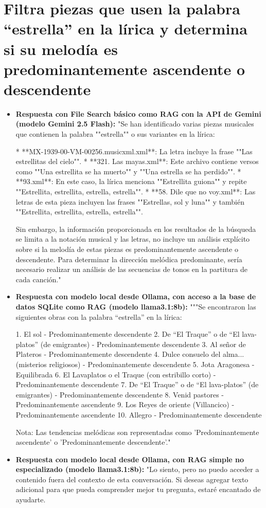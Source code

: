 \section{Filtra piezas que usen la palabra ``estrella'' en la lírica y determina si su melodía es predominantemente ascendente o descendente}
\begin{itemize}
    \item \textbf{Respuesta con File Search básico como RAG con la API de Gemini (modelo Gemini 2.5 Flash):} "Se han identificado varias piezas musicales que contienen la palabra ""estrella"" o sus variantes en la lírica:

*   **MX-1939-00-VM-00256.musicxml.xml**: La letra incluye la frase ""Las estrellitas del cielo"".
*   **321. Las mayas.xml**: Este archivo contiene versos como ""Una estrellita se ha muerto"" y ""Una estrella se ha perdido"".
*   **93.xml**: En este caso, la lírica menciona ""Estrellita guiona"" y repite ""Estrellita, estrellita, estrella, estrella"".
*   **58. Dile que no voy.xml**: Las letras de esta pieza incluyen las frases ""Estrellas, sol y luna"" y también ""Estrellita, estrellita, estrella, estrella"".

Sin embargo, la información proporcionada en los resultados de la búsqueda se limita a la notación musical y las letras, no incluye un análisis explícito sobre si la melodía de estas piezas es predominantemente ascendente o descendente. Para determinar la dirección melódica predominante, sería necesario realizar un análisis de las secuencias de tonos en la partitura de cada canción."
    \item \textbf{Respuesta con modelo local desde Ollama, con acceso a la base de datos SQLite como RAG (modelo llama3.1:8b):} """Se encontraron las siguientes obras con la palabra ``estrella'' en la lírica:

1. El sol - Predominantemente descendente
2. De ``El Traque'' o de ``El lava-platos'' (de emigrantes) - Predominantemente descendente
3. Al señor de Plateros - Predominantemente descendente
4. Dulce consuelo del alma... (misterios religiosos) - Predominantemente descendente
5. Jota Aragonesa - Equilibrada
6. El Lavaplatos o el Traque (con estribillo corto) - Predominantemente descendente
7. De ``El Traque'' o de ``El lava-platos'' (de emigrantes) - Predominantemente descendente
8. Venid pastores - Predominantemente ascendente
9. Los Reyes de oriente (Villancico) - Predominantemente ascendente
10. Allegro - Predominantemente descendente

Nota: Las tendencias melódicas son representadas como 'Predominantemente ascendente' o 'Predominantemente descendente'."
\item \textbf{Respuesta con modelo local desde Ollama, con RAG simple no especializado (modelo llama3.1:8b):} "Lo siento, pero no puedo acceder a contenido fuera del contexto de esta conversación. Si deseas agregar texto adicional para que pueda comprender mejor tu pregunta, estaré encantado de ayudarte. 


\end{itemize}
